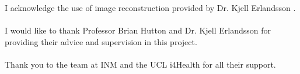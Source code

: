 \begin{acknowledgements}
I acknowledge the use of image reconstruction provided by Dr. Kjell Erlandsson \cite{8069508}.
\paragraph{}
I would like to thank Professor Brian Hutton and Dr. Kjell Erlandsson for providing their advice and supervision in this project. 
\paragraph{}
Thank you to the team at INM and the UCL i4Health for all their support. 
\end{acknowledgements}

\setcounter{tocdepth}{2} 

\tableofcontents
\listoffigures
 \listoftables
%
\printglossaries
